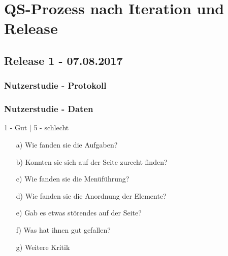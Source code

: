 \documentclass[accentcolor=tud0b,12pt,paper=a4]{tudreport}
\begin{document}
\chapter{QS-Prozess nach Iteration und Release}














\pagebreak
\section{Release 1 - 07.08.2017}

	\subsection*{Nutzerstudie - Protokoll}
	
	
	\subsection*{Nutzerstudie - Daten}
	\begin{adjustbox}{max width=\textwidth}
	\end{adjustbox}
	\newline
	\begin{footnotesize} 1 - Gut | 5 - schlecht \end{footnotesize}
	\begin{itemize}
		\item[a)] Wie fanden sie die Aufgaben?
		\item[b)] Konnten sie sich auf der Seite zurecht finden?
		\item[c)] Wie fanden sie die Menüführung?
		\item[d)] Wie fanden sie die Anordnung der Elemente?
		\item[e)] Gab es etwas störendes auf der Seite?
		\item[f)] Was hat ihnen gut gefallen?
		\item[g)] Weitere Kritik
	\end{itemize}
\end{document}

